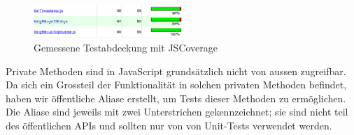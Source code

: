 \begin{figure}[!ht]
	\centering
	\includegraphics[width=0.5\textwidth]{images/gftlib-js/gftlibjs-testabdeckung}
	\caption{Gemessene Testabdeckung mit JSCoverage}
	\label{gftlibjs-testabdeckung}
\end{figure}

Private Methoden sind in JavaScript grundsätzlich nicht von aussen zugreifbar. Da sich ein Grossteil der Funktionalität in solchen privaten Methoden befindet, haben wir öffentliche Aliase erstellt, um Tests dieser Methoden zu ermöglichen. Die Aliase sind jeweils mit zwei Unterstrichen gekennzeichnet; sie sind nicht teil des öffentlichen \gls{API}s und sollten nur von von Unit-Tests verwendet werden.
